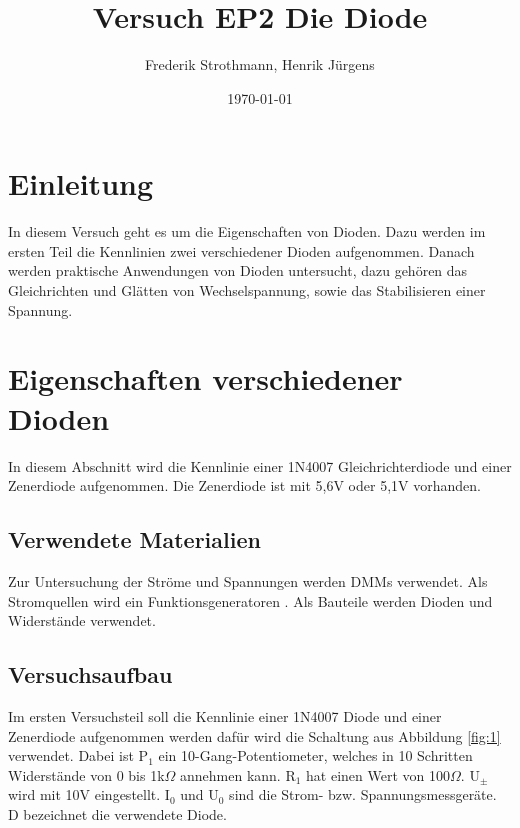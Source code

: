 \documentclass[12pt,a4paper]{article}
\title{Versuch EP2 Die Diode}
\author{Frederik Strothmann, Henrik Jürgens}
\date{\today}
\begin{document}
\maketitle
\newpage
\tableofcontents
\newpage
\section{Einleitung}
In diesem Versuch geht es um die Eigenschaften von Dioden. Dazu werden im ersten Teil die Kennlinien zwei verschiedener Dioden aufgenommen. Danach werden praktische Anwendungen von Dioden untersucht, dazu gehören das Gleichrichten und Glätten von Wechselspannung, sowie das Stabilisieren einer Spannung.
\section{Eigenschaften verschiedener Dioden}
In diesem Abschnitt wird die Kennlinie einer 1N4007 Gleichrichterdiode und einer Zenerdiode aufgenommen. Die Zenerdiode ist mit 5,6V oder 5,1V vorhanden.
\subsection{Verwendete Materialien}

Zur Untersuchung der Ströme und Spannungen werden DMMs verwendet. Als Stromquellen wird ein Funktionsgeneratoren . Als Bauteile werden Dioden und Widerstände verwendet.
\subsection{Versuchsaufbau}
Im ersten Versuchsteil soll die Kennlinie einer 1N4007 Diode und einer Zenerdiode aufgenommen werden dafür wird die Schaltung aus Abbildung \ref{fig:1} verwendet. Dabei ist P$_1$ ein 10-Gang-Potentiometer, welches in 10 Schritten Widerstände von 0 bis 1k$\Omega$ annehmen kann. R$_1$ hat einen Wert von 100$\Omega$. U$_\pm$ wird mit 10V eingestellt. I$_0$ und U$_0$ sind die Strom- bzw. Spannungsmessgeräte. D bezeichnet die verwendete Diode.
\end{document}
